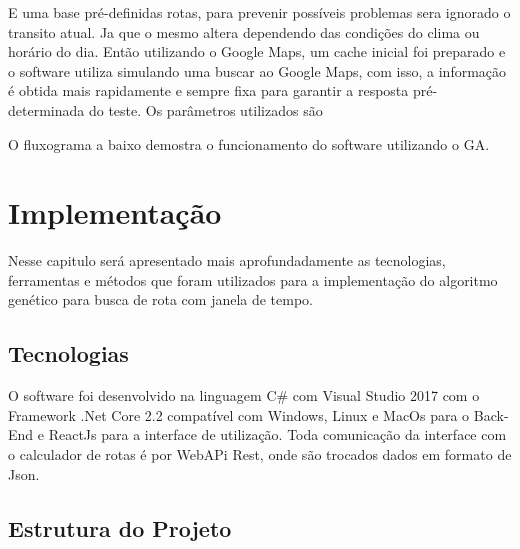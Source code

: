 E uma base pré-definidas rotas, para prevenir possíveis problemas sera ignorado o transito atual. Ja que o mesmo altera dependendo das condições do clima ou horário do dia. Então utilizando o Google Maps, um cache inicial foi preparado e o software utiliza simulando uma buscar ao Google Maps, com isso, a informação é obtida mais rapidamente e sempre fixa para garantir a resposta pré-determinada do teste.
Os parâmetros utilizados são

O fluxograma a baixo demostra o funcionamento do software utilizando o GA.

\begin{minipage}{\linewidth}
	\label{fig:FluxoGA}
\end{minipage}

\chapter{Implementação}
 
Nesse capitulo será apresentado mais aprofundadamente as tecnologias, ferramentas e métodos que foram utilizados para a implementação do algoritmo genético para busca de rota com janela de tempo.

\section{Tecnologias}

O software foi desenvolvido na linguagem C\# com Visual Studio 2017 com o Framework  .Net Core 2.2 compatível com Windows, Linux e MacOs para o Back-End e ReactJs para a interface de utilização.
Toda comunicação da interface com o calculador de rotas é por WebAPi Rest, onde são trocados dados em formato de Json.

\section{Estrutura do Projeto}

